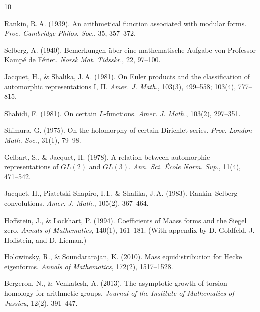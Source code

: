 \documentclass[12pt]{article}
\begin{document}
\begin{thebibliography}{10}

Rankin, R.\,A. (1939).
An arithmetical function associated with modular forms.
\textit{Proc. Cambridge Philos. Soc.}, 35, 357--372.

Selberg, A. (1940).
Bemerkungen \"uber eine mathematische Aufgabe von Professor Kamp\'e de F\'eriet.
\textit{Norsk Mat. Tidsskr.}, 22, 97--100.

Jacquet, H., \& Shalika, J.\,A. (1981).
On Euler products and the classification of automorphic representations I, II.
\textit{Amer. J. Math.}, 103(3), 499--558; 103(4), 777--815.

Shahidi, F. (1981).
On certain $L$-functions.
\textit{Amer. J. Math.}, 103(2), 297--351.

Shimura, G. (1975).
On the holomorphy of certain Dirichlet series.
\textit{Proc. London Math. Soc.}, 31(1), 79--98.

Gelbart, S., \& Jacquet, H. (1978).
A relation between automorphic representations of $GL(2)$ and $GL(3)$.
\textit{Ann. Sci. \'{E}cole Norm. Sup.}, 11(4), 471--542.

Jacquet, H., Piatetski-Shapiro, I.\,I., \& Shalika, J.\,A. (1983).
Rankin--Selberg convolutions.
\textit{Amer. J. Math.}, 105(2), 367--464.

Hoffstein, J., \& Lockhart, P. (1994).
Coefficients of Maass forms and the Siegel zero.
\textit{Annals of Mathematics}, 140(1), 161--181.
(With appendix by D. Goldfeld, J. Hoffstein, and D. Lieman.)

Holowinsky, R., \& Soundararajan, K. (2010).
Mass equidistribution for Hecke eigenforms.
\textit{Annals of Mathematics}, 172(2), 1517--1528.

Bergeron, N., \& Venkatesh, A. (2013).
The asymptotic growth of torsion homology for arithmetic groups.
\textit{Journal of the Institute of Mathematics of Jussieu}, 12(2), 391--447.

\end{thebibliography}
\end{document}
